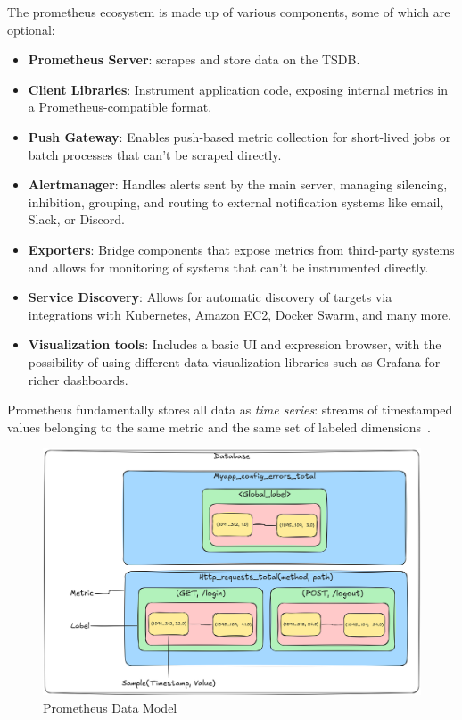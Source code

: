 The prometheus ecosystem is made up of various components, some of which are optional:

\begin{itemize}
    \item \textbf{Prometheus Server}: scrapes and store data on the \ac{TSDB}.
    \item \textbf{Client Libraries}: Instrument application code, exposing internal metrics in a
    Prometheus-compatible format.
    \item \textbf{Push Gateway}: Enables push-based metric collection for short-lived jobs or batch processes that
    can't be scraped directly.
    \item \textbf{Alertmanager}: Handles alerts sent by the main server, managing silencing, inhibition, grouping, and routing to external notification systems like email, Slack, or Discord.
    \item \textbf{Exporters}: Bridge components that expose metrics from third-party systems and allows for monitoring of
    systems that can't be instrumented directly.
    \item \textbf{Service Discovery}: Allows for automatic discovery of targets via integrations with Kubernetes,
    Amazon EC2, Docker Swarm, and many more.
    \item \textbf{Visualization tools}: Includes a basic UI and expression browser, with the possibility of using
    different data visualization libraries such as Grafana for richer dashboards.
\end{itemize}

Prometheus fundamentally stores all data as \textit{time series}: streams of timestamped
values belonging to the same metric and the same set of labeled dimensions~\cite{prometheus_data_model}.\\

\begin{figure}[H]
    \centering
    \includegraphics[width=0.9\linewidth, keepaspectratio]{./figures/samples_diagram}
    \caption{Prometheus Data Model}
\end{figure}


